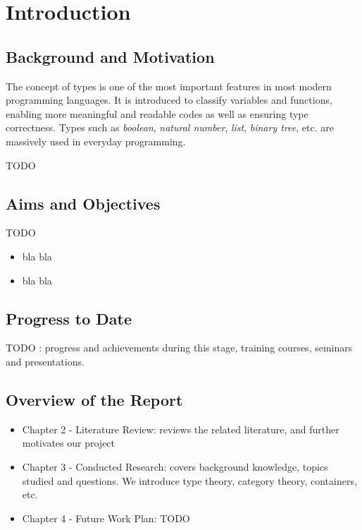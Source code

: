 \chapter{Introduction}

\section{Background and Motivation}

The concept of types is one of the most important features in most modern programming languages. It is introduced to classify variables and functions, enabling more meaningful and readable codes as well as ensuring type correctness. Types such as \textit{boolean}, \textit{natural number}, \textit{list}, \textit{binary tree}, etc. are massively used in everyday programming.

TODO

\section{Aims and Objectives}

TODO

\begin{itemize}
  \item{bla bla}
  \item{bla bla}
\end{itemize}

\section{Progress to Date}

TODO : progress and achievements during this stage, training courses, seminars and presentations.

\section{Overview of the Report}

\begin{itemize}
  \item{Chapter 2 - Literature Review: reviews the related literature, and further motivates our project}
  \item{Chapter 3 - Conducted Research: covers background knowledge, topics studied and questions. We introduce type theory, category theory, containers, etc.}
  \item{Chapter 4 - Future Work Plan: TODO}
\end{itemize}

